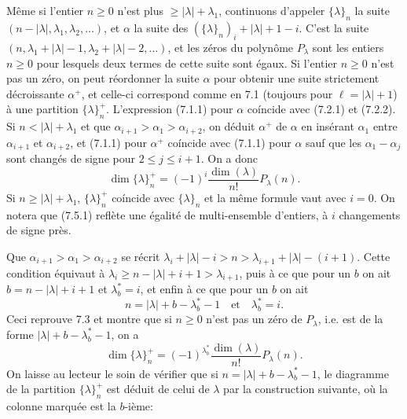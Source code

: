 \documentclass[11pt,a4paper]{article}
\theoremstyle{plain}
\theoremstyle{definition}
\begin{document}
\subsection{}
M\^eme si l'entier $n \geq 0$ n'est plus $\geq |\lambda| + \lambda_1$, continuons d'appeler $\{\lambda\}_n$ la suite $(n - |\lambda|, \lambda_1, \lambda_2, \ldots)$, et $\alpha$ la suite des $(\{\lambda\}_n)_i + |\lambda| + 1 - i$. C'est la suite $(n, \lambda_1 + |\lambda| - 1, \lambda_2 + |\lambda| - 2, \ldots)$, et les z\'eros du polyn\^ome $P_\lambda$ sont les entiers $n \geq 0$ pour lesquels deux termes de cette suite sont \'egaux. Si l'entier $n \geq 0$ n'est pas un z\'ero, on peut r\'eordonner la suite $\alpha$ pour obtenir une suite strictement d\'ecroissante $\alpha^+$, et celle-ci correspond comme en 7.1 (toujours pour $\ell = |\lambda| + 1$) \`a une partition $\{\lambda\}^+_n$. L'expression (7.1.1) pour $\alpha$ co\'incide avec (7.2.1) et (7.2.2). Si $n < |\lambda| + \lambda_1$ et que $\alpha_{i+1} > \alpha_1 > \alpha_{i+2}$, on d\'eduit $\alpha^+$ de $\alpha$ en ins\'erant $\alpha_1$ entre $\alpha_{i+1}$ et $\alpha_{i+2}$, et (7.1.1) pour $\alpha^+$ co\'incide avec (7.1.1) pour $\alpha$ sauf que les $\alpha_1 - \alpha_j$ sont chang\'es de signe pour $2 \leq j \leq i + 1$. On a donc
\begin{equation}
\dim \{\lambda\}^+_n = (-1)^i \frac{\dim(\lambda)}{n!} P_\lambda(n). \tag{7.5.1}
\end{equation}
Si $n \geq |\lambda| + \lambda_1$, $\{\lambda\}^+_n$ co\'incide avec $\{\lambda\}_n$ et la m\^eme formule vaut avec $i = 0$. On notera que (7.5.1) refl\`ete une \'egalit\'e de multi-ensemble d'entiers, \`a $i$ changements de signe pr\`es.

Que $\alpha_{i+1} > \alpha_1 > \alpha_{i+2}$ se r\'ecrit $\lambda_i + |\lambda| - i > n > \lambda_{i+1} + |\lambda| - (i+1)$. Cette condition \'equivaut \`a $\lambda_i \geq n - |\lambda| + i + 1 > \lambda_{i+1}$, puis \`a ce que pour un $b$ on ait $b = n - |\lambda| + i + 1$ et $\lambda^*_b = i$, et enfin \`a ce que pour un $b$ on ait
\[
n = |\lambda| + b - \lambda^*_b - 1 \quad \text{et} \quad \lambda^*_b = i.
\]
Ceci reprouve 7.3 et montre que si $n \geq 0$ n'est pas un z\'ero de $P_\lambda$, i.e. est de la forme $|\lambda| + b - \lambda^*_b - 1$, on a
\begin{equation}
\dim \{\lambda\}^+_n = (-1)^{\lambda^*_b} \frac{\dim(\lambda)}{n!} P_\lambda(n). \tag{7.5.2}
\end{equation}
On laisse au lecteur le soin de v\'erifier que si $n = |\lambda| + b - \lambda^*_b - 1$, le diagramme de la partition $\{\lambda\}^+_n$ est d\'eduit de celui de $\lambda$ par la construction suivante, o\`u la colonne marqu\'ee est la $b$-i\`eme:
\end{document}
